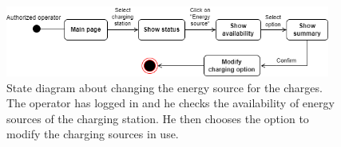 \documentclass[../main.tex]{subfiles}
\begin{document}
\begin{figure}[H]
    \centering
    \includegraphics[width=0.95\textwidth]{statecharts/sc_changeChargeOption.png}
    \caption{State diagram about changing the energy source for the charges. The operator has logged in and he checks the availability of energy sources of the charging station. He then chooses the option to modify the charging sources in use.}
    \label{fig:changeChargeOption}
\end{figure}
\end{document}

